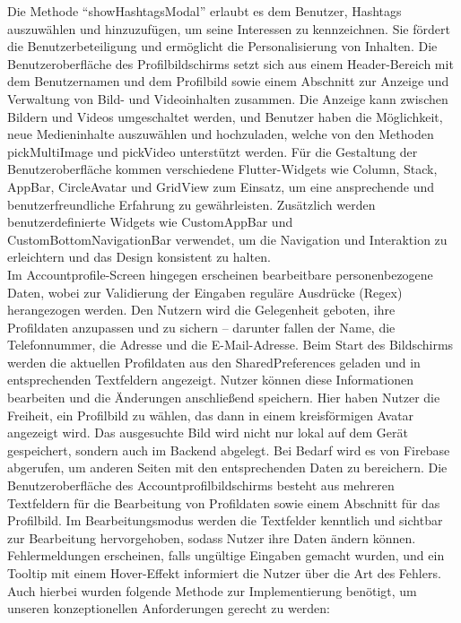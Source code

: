 Die Methode ``showHashtagsModal'' erlaubt es dem Benutzer, Hashtags auszuwählen und hinzuzufügen, um seine Interessen zu kennzeichnen. Sie fördert die Benutzerbeteiligung und ermöglicht die Personalisierung von Inhalten.
Die Benutzeroberfläche des Profilbildschirms setzt sich aus einem Header-Bereich mit dem Benutzernamen und dem Profilbild sowie einem Abschnitt zur Anzeige und Verwaltung von Bild- und Videoinhalten zusammen. 
Die Anzeige kann zwischen Bildern und Videos umgeschaltet werden, und Benutzer haben die Möglichkeit, neue Medieninhalte auszuwählen und hochzuladen, welche von den Methoden pickMultiImage und pickVideo unterstützt werden. 
Für die Gestaltung der Benutzeroberfläche kommen verschiedene Flutter-Widgets wie Column, Stack, AppBar, CircleAvatar und GridView zum Einsatz, um eine ansprechende und benutzerfreundliche Erfahrung zu gewährleisten.
Zusätzlich werden benutzerdefinierte Widgets wie CustomAppBar und CustomBottomNavigationBar verwendet, um die Navigation und Interaktion zu erleichtern und das Design konsistent zu halten.
\\
Im Accountprofile-Screen hingegen erscheinen bearbeitbare personenbezogene Daten, wobei zur Validierung der Eingaben reguläre Ausdrücke (Regex) herangezogen werden. 
Den Nutzern wird die Gelegenheit geboten, ihre Profildaten anzupassen und zu sichern – darunter fallen der Name, die Telefonnummer, die Adresse und die E-Mail-Adresse. 
Beim Start des Bildschirms werden die aktuellen Profildaten aus den SharedPreferences geladen und in entsprechenden Textfeldern angezeigt. 
Nutzer können diese Informationen bearbeiten und die Änderungen anschließend speichern. Hier haben Nutzer die Freiheit, ein Profilbild zu wählen, das dann in einem kreisförmigen Avatar angezeigt wird. 
Das ausgesuchte Bild wird nicht nur lokal auf dem Gerät gespeichert, sondern auch im Backend abgelegt. Bei Bedarf wird es von Firebase abgerufen, um anderen Seiten mit den entsprechenden Daten zu bereichern. Die Benutzeroberfläche des Accountprofilbildschirms besteht aus mehreren Textfeldern für die Bearbeitung von Profildaten sowie einem Abschnitt für das Profilbild. 
Im Bearbeitungsmodus werden die Textfelder kenntlich und sichtbar zur Bearbeitung hervorgehoben, sodass Nutzer ihre Daten ändern können. Fehlermeldungen erscheinen, falls ungültige Eingaben gemacht wurden, und ein Tooltip mit einem Hover-Effekt informiert die Nutzer über die Art des Fehlers.
Auch hierbei wurden folgende Methode zur Implementierung benötigt, um unseren konzeptionellen Anforderungen gerecht zu werden: 
\\
